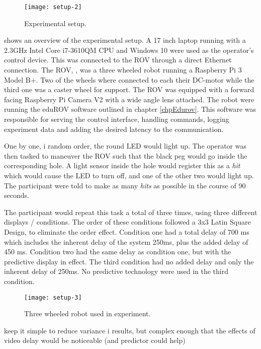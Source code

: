 \begin{figure}[h!]
    \centering
    \texttt{[image: setup-2]}
    \caption{Experimental setup.}
    \label{expsetup}
\end{figure}

 shows an overview of the experimental setup. A 17 inch laptop running with a 2.3GHz Intel Core i7-3610QM CPU and Windows 10 were used as the operator's control device. This was connected to the ROV through a direct Ethernet connection. The ROV, , was a three wheeled robot running a Raspberry Pi 3 Model B+. Two of the wheels where connected to each their DC-motor while the third one was a caster wheel for support. The ROV was equipped with a forward facing Raspberry Pi Camera V2 with a wide angle lens attached. The robot were running the eduROV software outlined in chapter \ref{chpEdurov}. This software was responsible for serving the control interface, handling commands, logging experiment data and adding the desired latency to the communication.

One by one, i random order, the round LED would light up. The operator was then tasked to maneuver the ROV such that the black peg would go inside the corresponding hole. A light sensor inside the hole would register this as a \emph{hit} which would cause the LED to turn off, and one of the other two would light up. The participant were told to make as many \emph{hits} as possible in the course of 90 seconds.

The participant would repeat this task a total of three times, using three different displays / conditions. The order of these conditions followed a 3x3 Latin Square Design, to eliminate the order effect. Condition one had a total delay of 700 ms which includes the inherent delay of the system 250ms, plus the added delay of 450 ms. Condition two had the same delay as condition one, but with the predictive display in effect. The third condition had no added delay and only the inherent delay of 250ms. No predictive technology were used in the third condition.

\begin{figure}[h!]
    \centering
    \texttt{[image: setup-3]}
    \caption{Three wheeled robot used in experiment.}
    \label{setup3}
\end{figure}



keep it simple to reduce variance i results, but complex enough that the effects of video delay would be noticeable (and predictor could help)

